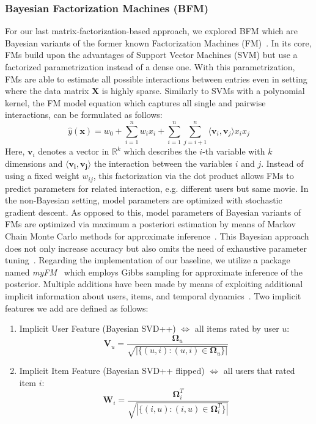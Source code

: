\documentclass[10pt,conference,compsocconf]{IEEEtran}
\begin{document}
    \subsubsection{Bayesian Factorization Machines (BFM)}
    For our last matrix-factorization-based approach, we explored BFM which are Bayesian variants of the former known Factorization Machines (FM)~\cite{rendle_factorization_2010}.
    In its core, FMs build upon the advantages of Support Vector Machines (SVM) but use a factorized parametrization instead of a dense one.
    With this parametrization, FMs are able to estimate all possible interactions between entries even in setting where the data matrix $\mathbf{X}$ is highly sparse.
    Similarly to SVMs with a polynomial kernel, the FM model equation which captures all single and pairwise interactions, can be formulated as follows:
    $$\hat{y}(\mathbf{x})=w_0+\sum^n_{i=1}w_ix_i + \sum^n_{i=1}\sum^n_{j=i+1}\langle \mathbf{v}_i,\mathbf{v}_j \rangle x_ix_j$$
    Here, $\mathbf{v}_i$ denotes a vector in $\mathbb{R}^k$ which describes the $i$-th variable with $k$ dimensions and $\langle \mathbf{v_i},\mathbf{v_j} \rangle$ the interaction between the variables $i$ and $j$.
    Instead of using a fixed weight $w_{ij}$, this factorization via the dot product allows FMs to predict parameters for related interaction, e.g. different users but same movie.
    In the non-Bayesian setting, model parameters are optimized with stochastic gradient descent.
    As opposed to this, model parameters of Bayesian variants of FMs are optimized via maximum a posteriori estimation by means of Markov Chain Monte Carlo methods for approximate inference~\cite{salakhutdinov_bayesian_2008}.
    This Bayesian approach does not only increase accuracy but also omits the need of exhaustive parameter tuning~\cite{freudenthaler_bayesian_2011}.
    Regarding the implementation of our baseline, we utilize a package named \textit{myFM}~\cite{noauthor_myfm_nodate} which employs Gibbs sampling for approximate inference of the posterior.
    Multiple additions have been made by means of exploiting additional implicit information about users, items, and temporal dynamics~\cite{rendle_scaling_2013,koren_factorization_2008,koren_collaborative_2009}.
    Two implicit features we add are defined as follows:
    \begin{enumerate}
        \item Implicit User Feature (Bayesian SVD++) $\Leftrightarrow$ all items rated by user $u$:
        $$\mathbf{V}_u=\frac{\mathbf{\Omega}_u}{\sqrt{|\{(u,i): (u,i) \in \mathbf{\Omega}_u\}|}}$$
        \item Implicit Item Feature (Bayesian SVD++ flipped) $\Leftrightarrow$ all users that rated item $i$:
        $$\mathbf{W}_i=\frac{\mathbf{\Omega}^T_i}{\sqrt{|\{(i,u): (i,u) \in \mathbf{\Omega}^T_i\}|}}$$
    \end{enumerate}
\end{document}
